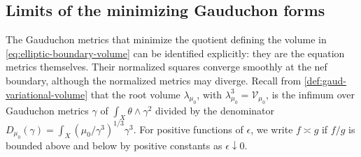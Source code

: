 \subsection{Limits of the minimizing Gauduchon forms}
\label{sec:elliptic-gauduchon-limits}

The Gauduchon metrics that minimize the quotient defining the volume in \eqref{eq:elliptic-boundary-volume} can be identified explicitly: they are the equation metrics themselves. Their normalized squares converge smoothly at the nef boundary, although the normalized metrics may diverge. Recall from \cref{def:gaud-variational-volume} that the root volume $\lambda_{\mu_0}$, with $\lambda_{\mu_0}^3=\mathcal V_{\mu_0}$, is the infimum over Gauduchon metrics $\gamma$ of $\int_X\theta\wedge\gamma^2$ divided by the denominator $D_{\mu_0}(\gamma)=\int_X(\mu_0/\gamma^3)^{1/3}\gamma^3$. For positive functions of $\epsilon$, we write $f\asymp g$ if $f/g$ is bounded above and below by positive constants as $\epsilon\downarrow0$.

